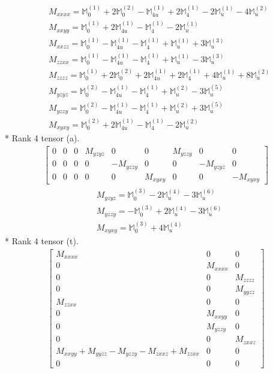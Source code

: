 \documentclass[fleqn,8pt,landscape]{jsarticle}
\begin{document}
\begin{align*}
& M_{xxxx} = \mathbb{M}_{0}^{(1)} + 2 \mathbb{M}_{0}^{(2)} - \mathbb{M}_{4u}^{(1)} + 2 \mathbb{M}_{4}^{(1)} - 2 \mathbb{M}_{u}^{(1)} - 4 \mathbb{M}_{u}^{(2)} \\
& M_{xxyy} = \mathbb{M}_{0}^{(1)} + 2 \mathbb{M}_{4u}^{(1)} - \mathbb{M}_{4}^{(1)} - 2 \mathbb{M}_{u}^{(1)} \\
& M_{xxzz} = \mathbb{M}_{0}^{(1)} - \mathbb{M}_{4u}^{(1)} - \mathbb{M}_{4}^{(1)} + \mathbb{M}_{u}^{(1)} + 3 \mathbb{M}_{u}^{(3)} \\
& M_{zzxx} = \mathbb{M}_{0}^{(1)} - \mathbb{M}_{4u}^{(1)} - \mathbb{M}_{4}^{(1)} + \mathbb{M}_{u}^{(1)} - 3 \mathbb{M}_{u}^{(3)} \\
& M_{zzzz} = \mathbb{M}_{0}^{(1)} + 2 \mathbb{M}_{0}^{(2)} + 2 \mathbb{M}_{4u}^{(1)} + 2 \mathbb{M}_{4}^{(1)} + 4 \mathbb{M}_{u}^{(1)} + 8 \mathbb{M}_{u}^{(2)} \\
& M_{yzyz} = \mathbb{M}_{0}^{(2)} - \mathbb{M}_{4u}^{(1)} - \mathbb{M}_{4}^{(1)} + \mathbb{M}_{u}^{(2)} - 3 \mathbb{M}_{u}^{(5)} \\
& M_{yzzy} = \mathbb{M}_{0}^{(2)} - \mathbb{M}_{4u}^{(1)} - \mathbb{M}_{4}^{(1)} + \mathbb{M}_{u}^{(2)} + 3 \mathbb{M}_{u}^{(5)} \\
& M_{xyxy} = \mathbb{M}_{0}^{(2)} + 2 \mathbb{M}_{4u}^{(1)} - \mathbb{M}_{4}^{(1)} - 2 \mathbb{M}_{u}^{(2)}
\end{align*}
* Rank 4 tensor (a).
\begin{align*}
\begin{bmatrix} 0 & 0 & 0 & M_{yzyz} & 0 & 0 & M_{yzzy} & 0 & 0 \\ 0 & 0 & 0 & 0 & - M_{yzzy} & 0 & 0 & - M_{yzyz} & 0 \\ 0 & 0 & 0 & 0 & 0 & M_{xyxy} & 0 & 0 & - M_{xyxy} \end{bmatrix}
\end{align*}
\begin{align*}
& M_{yzyz} = \mathbb{M}_{0}^{(3)} - 2 \mathbb{M}_{u}^{(4)} - 3 \mathbb{M}_{u}^{(6)} \\
& M_{yzzy} = - \mathbb{M}_{0}^{(3)} + 2 \mathbb{M}_{u}^{(4)} - 3 \mathbb{M}_{u}^{(6)} \\
& M_{xyxy} = \mathbb{M}_{0}^{(3)} + 4 \mathbb{M}_{u}^{(4)}
\end{align*}
* Rank 4 tensor (t).
\begin{align*}
\begin{bmatrix} M_{xxxx} & 0 & 0 \\ 0 & M_{xxxx} & 0 \\ 0 & 0 & M_{zzzz} \\ 0 & 0 & M_{yyzz} \\ M_{zzxx} & 0 & 0 \\ 0 & M_{xxyy} & 0 \\ 0 & M_{yzzy} & 0 \\ 0 & 0 & M_{zxxz} \\ M_{xxyy} + M_{yyzz} - M_{yzzy} - M_{zxxz} + M_{zzxx} & 0 & 0 \\ 0 & 0 & 0 \end{bmatrix}
\end{align*}
\end{document}
